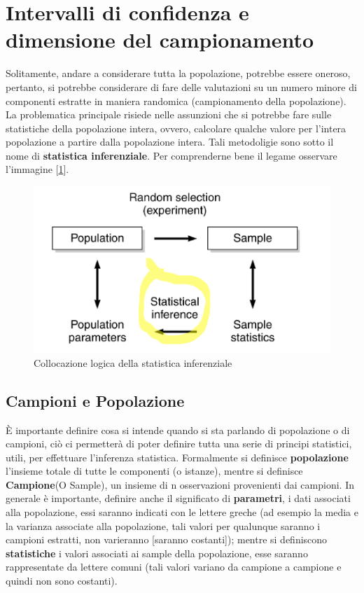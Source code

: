 \section{Intervalli di confidenza e dimensione del campionamento}
Solitamente, andare a considerare tutta la popolazione, potrebbe essere oneroso, pertanto, si potrebbe considerare di fare delle valutazioni su un numero minore di componenti estratte in maniera randomica (campionamento della popolazione). La problematica principale risiede nelle assunzioni che si potrebbe fare sulle statistiche della popolazione intera, ovvero, calcolare qualche valore per l'intera popolazione a partire dalla popolazione intera. Tali metodoligie sono sotto il nome di \textbf{statistica inferenziale}.
Per comprenderne bene il legame osservare l'immagine [\ref{img:statistica-inferenziale}].

\begin{figure}[h]
\centering
\includegraphics[width=.7\textwidth]{img/chapter-4/statistical-inference.png}
\caption{Collocazione logica della statistica inferenziale}\label{img:statistica-inferenziale}
\end{figure}

\subsection{Campioni e Popolazione}
\uppercase{è} importante definire cosa si intende quando si sta parlando di popolazione o di campioni, ciò ci permetterà di poter definire tutta una serie di principi statistici, utili, per effettuare l'inferenza statistica.
Formalmente si definisce \textbf{popolazione} l'insieme totale di tutte le componenti (o istanze), mentre si definisce \textbf{Campione}(O Sample), un insieme di n osservazioni provenienti dai campioni. In generale è importante, definire anche il significato di \textbf{parametri}, i dati associati alla popolazione, essi saranno indicati con le lettere greche (ad esempio la media e la varianza associate alla popolazione, tali valori per qualunque saranno i campioni estratti, non varieranno [saranno costanti]); mentre si definiscono \textbf{statistiche} i valori associati ai sample della popolazione, esse saranno rappresentate da lettere comuni (tali valori variano da campione a campione e quindi non sono costanti).

